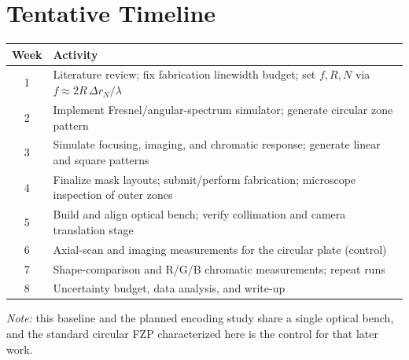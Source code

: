 \documentclass[11pt,a4paper]{article}
\begin{document}
\section{Tentative Timeline}

\begin{center}
\small\begin{tabular}{@{}cl@{}}
\toprule
\textbf{Week} & \textbf{Activity} \\
\midrule
1 & Literature review; fix fabrication linewidth budget; set $f,R,N$ via $f\approx 2R\,\Delta r_N/\lambda$ \\
2 & Implement Fresnel/angular-spectrum simulator; generate circular zone pattern \\
3 & Simulate focusing, imaging, and chromatic response; generate linear and square patterns \\
4 & Finalize mask layouts; submit/perform fabrication; microscope inspection of outer zones \\
5 & Build and align optical bench; verify collimation and camera translation stage \\
6 & Axial-scan and imaging measurements for the circular plate (control) \\
7 & Shape-comparison and R/G/B chromatic measurements; repeat runs \\
8 & Uncertainty budget, data analysis, and write-up \\
\bottomrule
\end{tabular}
\end{center}

\noindent\emph{Note:} this baseline and the planned encoding study share a single optical bench, and the standard circular FZP characterized here is the control for that later work.
\end{document}
